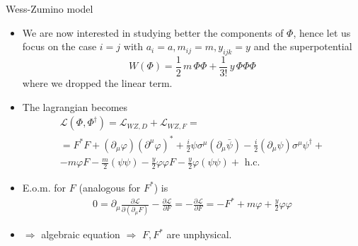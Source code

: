 \documentclass[10pt]{beamer}
\begin{document}
\begin{frame}{Wess-Zumino model}
    \begin{itemize}
        \item We are now interested in studying better the components of $\Phi$, hence let us focus on the case $i=j$ with $a_{i} = a, m_{ij}=m, y_{ijk}=y$ and the superpotential
            \begin{equation*}
                W(\Phi) = \frac{1}{2} \, m \, \Phi\Phi + \frac{1}{3!} \,  y \, \Phi \Phi \Phi
            \end{equation*}
            where we dropped the linear term.
        \item The lagrangian becomes
            \begin{gather*}
                \mathcal{L}(\Phi, \Phi^{\dagger}) = \mathcal{L}_{WZ, D} + \mathcal{L}_{WZ, F} = \\ 
                = F^{*} F+\left(\partial_{\mu} \varphi\right)\left(\partial^{\mu} \varphi\right)^{*}+\frac{i}{2} \psi \sigma^{\mu}\left(\partial_{\mu} \bar{\psi}\right)-\frac{i}{2}\left(\partial_{\mu} \psi\right) \sigma^{\mu} \psi^{\dagger} + \\
                    -m \varphi F-\frac{m}{2}(\psi \psi)-\frac{y}{2} \varphi \varphi F-\frac{y}{2} \varphi(\psi \psi)+\text { h.c. }
            \end{gather*}
        \item E.o.m. for $F$ (analogous for $F^{*}$) is
            \begin{gather*}
                0=\partial_{\mu} \frac{\partial \mathcal{L}}{\partial\left(\partial_{\mu} F\right)}-\frac{\partial \mathcal{L}}{\partial F}=-\frac{\partial \mathcal{L}}{\partial F}=-F^{*}+m \varphi+\frac{y}{2} \varphi \varphi
            \end{gather*}
        \item $\Rightarrow$ algebraic equation $\Rightarrow$ $F,F^{*}$ are unphysical. 
    \end{itemize}
\end{frame}
\end{document}
